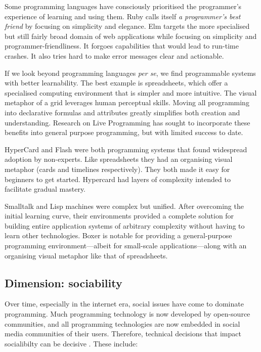 \documentclass[ twoside,openright,titlepage,numbers=noenddot,headinclude,footinclude,cleardoublepage=empty,abstract=on,
                BCOR=5mm,paper=a4,fontsize=11pt
                ]{scrreprt}
\theoremstyle{definition}
\begin{document}
Some programming languages have consciously prioritised the programmer's
experience of learning and using them. Ruby calls itself \emph{a
programmer's best friend} by focusing on simplicity and elegance. Elm
targets the more specialised but still fairly broad domain of web
applications while focusing on simplicity and programmer-friendliness.
It forgoes capabilities that would lead to run-time crashes. It also
tries hard to make error messages clear and actionable.

If we look beyond programming languages \emph{per se}, we find
programmable systems with better learnability. The best example is
spreadsheets, which offer a specialised computing environment that is
simpler and more intuitive. The visual metaphor of a grid leverages
human perceptual skills. Moving all programming into declarative
formulas and attributes greatly simplifies both creation and
understanding. Research on Live Programming
\parencite{Hancock2003,BretVictor} has sought to incorporate these
benefits into general purpose programming, but with limited success to
date.

HyperCard and Flash were both programming systems that found widespread
adoption by non-experts. Like spreadsheets they had an organising visual
metaphor (cards and timelines respectively). They both made it easy for
beginners to get started. Hypercard had layers of complexity intended to
facilitate gradual mastery.

Smalltalk and Lisp machines were complex but unified. After overcoming
the initial learning curve, their environments provided a complete
solution for building entire application systems of arbitrary complexity
without having to learn other technologies. Boxer
\parencite{BoxerDesign} is notable for providing a general-purpose
programming environment---albeit for small-scale applications---along
with an organising visual metaphor like that of spreadsheets.

\hypertarget{dimension-sociability}{\subsection{Dimension: sociability}\label{dimension-sociability}}

Over time, especially in the internet era, social issues have come to
dominate programming. Much programming technology is now developed by
open-source communities, and all programming technologies are now
embedded in social media communities of their users. Therefore,
technical decisions that impact socialibilty can be decisive
\parencite{SocioPLT}. These include:
\end{document}
